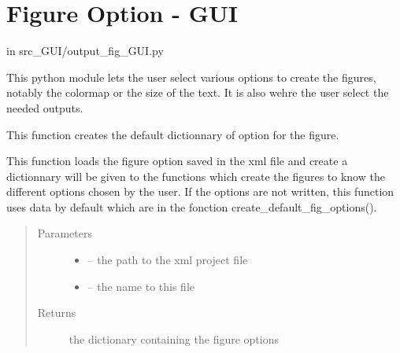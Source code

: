 \documentclass[letterpaper,10pt,english]{sphinxmanual}
\begin{document}
\section{Figure Option - GUI}
\label{\detokenize{index:figure-option-gui}}
in src\_GUI/output\_fig\_GUI.py

This python module lets the user select various options to create the figures, notably the colormap or the size of the text.
It is also wehre the user select the needed outputs.
\label{\detokenize{index:module-src_GUI.output_fig_GUI}}

\begin{fulllineitems}
\label{\detokenize{index:src_GUI.output_fig_GUI.create_default_figoption}}
This function creates the default dictionnary of option for the figure.

\end{fulllineitems}


\begin{fulllineitems}
\label{\detokenize{index:src_GUI.output_fig_GUI.load_fig_option}}
This function loads the figure option saved in the xml file and create a dictionnary will be given to the functions
which create the figures to know the different options chosen by the user. If the options are not written, this
function uses data by default which are in the fonction create\_default\_fig\_options().
\begin{quote}\begin{description}
\item[{Parameters}] \leavevmode\begin{itemize}
\item {} 
 -- the path to the xml project file

\item {} 
 -- the name to this file

\end{itemize}

\item[{Returns}] \leavevmode
the dictionary containing the figure options

\end{description}\end{quote}

\end{fulllineitems}
\end{document}
